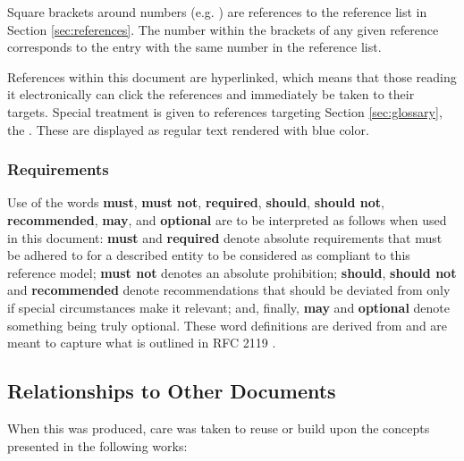 Square brackets around numbers (e.g. \cite{delsing2017iot}) are references to the reference list in Section \ref{sec:references}.
The number within the brackets of any given reference corresponds to the entry with the same number in the reference list.

References within this document are hyperlinked, which means that those reading it electronically can click the references and immediately be taken to their targets.
Special treatment is given to references targeting Section \ref{sec:glossary}, the .
These are displayed as regular text rendered with blue color.

\subsubsection{Requirements}

Use of the words \textbf{must}, \textbf{must not}, \textbf{required}, \textbf{should}, \textbf{should not}, \textbf{recommended}, \textbf{may}, and \textbf{optional} are to be interpreted as follows when used in this document: \textbf{must} and \textbf{required} denote absolute requirements that must be adhered to for a described entity to be considered as compliant to this reference model; \textbf{must not} denotes an absolute prohibition; \textbf{should}, \textbf{should not} and \textbf{recommended} denote recommendations that should be deviated from only if special circumstances make it relevant; and, finally, \textbf{may} and \textbf{optional} denote something being truly optional.
These word definitions are derived from and are meant to capture what is outlined in RFC 2119 \cite{bradner1997keywords}.

\subsection{Relationships to Other Documents}
\label{sec:introduction:relationships}

When this  was produced, care was taken to reuse or build upon the concepts presented in the following works:

